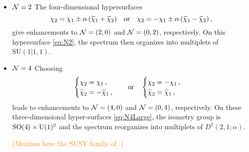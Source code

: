 \documentclass[a4paper, 11pt]{article}
\numberwithin{equation}{section}
\newcommand{\ts}[1]{\widetilde{#1}}
\newcommand{\SU}[1]{\mathrm{SU}( #1 )}
\newcommand{\SO}[1]{\mathrm{SO}( #1 )}
\newcommand{\+}{\oplus}
\newcommand{\CE}[1]{\textcolor{darkorange}{#1}}
\begin{document}
\begin{itemize}
	\item {\boldmath ${\cal N}=2$} The four-dimensional hypersurfaces
	\begin{equation} \label{eq:N2}
		\chi_{2} = \chi_{1} \pm\alpha\,(\ts{\chi}_{1}+\ts{\chi}_{2})%
		\quad {\rm or}\quad \chi_{2} = -\chi_{1} \pm\alpha\,(\ts{\chi}_{1}-\ts{\chi}_{2})%
		\,,
	\end{equation}
	give enhancements to ${\cal N}=(2,0)$ and ${\cal N}=(0,2)$, respectively. On this hypersurface \eqref{eq:N2}, the spectrum then organizes into multiplets of $\SU{1\vert1,1}$.
	\item {\boldmath ${\cal N}=4$} Choosing
	\begin{equation} \label{eq:N4Large}
		\begin{cases}
			\chi_{2} = \chi_{1}\,,\\%
			\ts{\chi}_{2} = -\ts{\chi}_{1}\,,%
		\end{cases}
		\quad {\rm or }\quad
		\begin{cases}
			\chi_{2} = - \chi_{1}\,,\\%
			\ts{\chi}_{2} = \ts{\chi}_{1}\,,%
		\end{cases}%
	\end{equation}
	leads to enhancements to ${\cal N}=(4,0)$ and ${\cal N}=(0,4)$, respectively. On these three-dimensional hyper-surfaces \eqref{eq:N4Large}, the isometry group is $\SO{4}\times {\rm U}(1)^{2}$ and the spectrum reorganizes into multiplets of $D^{1}(2,1;\alpha)$.

	\CE{(Mention here the SUSY family of \cite{Eloy:2021fhc}.)}
	

\end{itemize}
\end{document}
